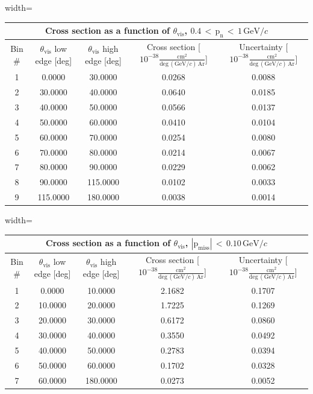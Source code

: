 \begin{table}[H]
\raggedright
\begin{adjustbox}{width=\textwidth}
\small
\begin{tabular}{ |c|c|c|c|c| }
\hline
\multicolumn{5}{|c|}{Cross section as a function of $\theta_{\mathrm{vis}}$, $\mathrm{0.4\,<\,p_{n}\,<\,1\,GeV/\textit{c}}$} \\
\hline
\hline
Bin \# & $\theta_{\mathrm{vis}}$ low edge [deg] & $\theta_{\mathrm{vis}}$ high edge [deg] & Cross section [$10^{-38}\mathrm{\frac{cm^{2}}{deg\,(GeV/\textit{c})\,Ar}}$] & Uncertainty [$10^{-38}\mathrm{\frac{cm^{2}}{deg\,(GeV/\textit{c})\,Ar}}$] \\
\hline
\hline
1 & 0.0000 & 30.0000 & 0.0268 & 0.0088\\
2 & 30.0000 & 40.0000 & 0.0640 & 0.0185\\
3 & 40.0000 & 50.0000 & 0.0566 & 0.0137\\
4 & 50.0000 & 60.0000 & 0.0410 & 0.0104\\
5 & 60.0000 & 70.0000 & 0.0254 & 0.0080\\
6 & 70.0000 & 80.0000 & 0.0214 & 0.0067\\
7 & 80.0000 & 90.0000 & 0.0229 & 0.0062\\
8 & 90.0000 & 115.0000 & 0.0102 & 0.0033\\
9 & 115.0000 & 180.0000 & 0.0038 & 0.0014\\
\hline
\end{tabular}
\end{adjustbox}
\end{table}


\begin{table}[H]
\raggedright
\begin{adjustbox}{width=\textwidth}
\small
\begin{tabular}{ |c|c|c|c|c| }
\hline
\multicolumn{5}{|c|}{Cross section as a function of $\theta_{\mathrm{vis}}$, $\mathrm{|p_{miss}|\,<\,0.10\,GeV/\textit{c}}$} \\
\hline
\hline
Bin \# & $\theta_{\mathrm{vis}}$ low edge [deg] & $\theta_{\mathrm{vis}}$ high edge [deg] & Cross section [$10^{-38}\mathrm{\frac{cm^{2}}{deg\,(GeV/\textit{c})\,Ar}}$] & Uncertainty [$10^{-38}\mathrm{\frac{cm^{2}}{deg\,(GeV/\textit{c})\,Ar}}$] \\
\hline
\hline
1 & 0.0000 & 10.0000 & 2.1682 & 0.1707\\
2 & 10.0000 & 20.0000 & 1.7225 & 0.1269\\
3 & 20.0000 & 30.0000 & 0.6172 & 0.0860\\
4 & 30.0000 & 40.0000 & 0.3550 & 0.0492\\
5 & 40.0000 & 50.0000 & 0.2783 & 0.0394\\
6 & 50.0000 & 60.0000 & 0.1702 & 0.0328\\
7 & 60.0000 & 180.0000 & 0.0273 & 0.0052\\
\hline
\end{tabular}
\end{adjustbox}
\end{table}


